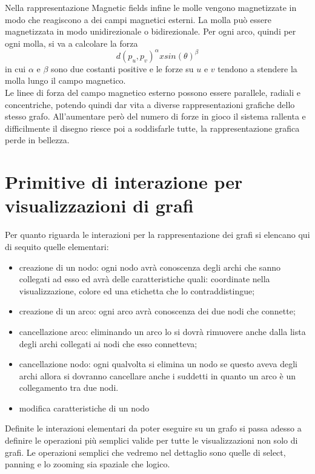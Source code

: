 {Nella rappresentazione Magnetic fields infine le molle vengono magnetizzate in modo che reagiscono
a dei campi magnetici esterni. La molla può essere magnetizzata in modo unidirezionale o bidirezionale.
Per ogni arco, quindi per ogni molla, si va a calcolare la forza 
$$  d(p_u,p_v)^\alpha x sin(\theta)^\beta $$ in cui $\alpha$ e $\beta$ sono due costanti positive e le forze su $u$ e $v$ tendono a stendere la molla lungo il campo magnetico.\\
Le linee di forza del campo magnetico esterno possono essere parallele, radiali e concentriche, potendo quindi dar vita a diverse rappresentazioni grafiche dello stesso grafo.
All'aumentare però del numero di forze in gioco il sistema rallenta e difficilmente il disegno riesce poi a
soddisfarle tutte, la rappresentazione grafica perde in bellezza.

\section{Primitive di interazione per visualizzazioni di grafi}
Per quanto riguarda le interazioni per la rappresentazione dei grafi si elencano qui di sequito quelle elementari:
\begin{itemize}
	\item creazione di un nodo: ogni nodo avrà conoscenza degli archi che sanno collegati ad esso ed avrà delle caratteristiche quali: coordinate nella visualizzazione, colore ed una etichetta che lo contraddistingue; 
	\item creazione di un arco: ogni arco avrà conoscenza dei due nodi che connette;
	\item cancellazione arco: eliminando un arco lo si dovrà rimuovere anche dalla lista degli archi collegati ai nodi che esso connetteva;
	\item cancellazione nodo: ogni qualvolta si elimina un nodo se questo aveva degli archi allora si dovranno cancellare anche i suddetti in quanto un arco è un collegamento tra due nodi.
	\item modifica caratteristiche di un nodo
\end{itemize} 
Definite le interazioni elementari da poter eseguire su un grafo si passa adesso a definire le operazioni più semplici valide per tutte le visualizzazioni non solo di grafi.
Le operazioni semplici che vedremo nel dettaglio sono quelle di select, panning e lo zooming sia spaziale che logico.

}
